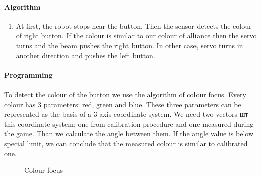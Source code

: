 	\paragraph{Algorithm}
	
	\begin{enumerate}	
		\item At first, the robot stops near the button. Then the sensor detects the colour of right button. If the colour is similar to our colour of alliance then the servo turns and the beam pushes the right button. In other case, servo turns in another direction and pushes the left button.  
	\end{enumerate}
	
	\paragraph{Programming}
 
	 To detect the colour of the button we use the algorithm of colour focus. Every colour has 3 parameters: red, green and blue. These three parameters can be represented as the basis of a 3-axis coordinate system. We need two vectors шт this coordinate system: one from calibration procedure and one measured during the game. Than we calculate the angle between them. If the angle value is below special limit, we can conclude that the measured colour is similar to calibrated one.
	 \begin{figure}[H]
	 	\begin{minipage}[h]{\linewidth}
	 		\caption{Colour focus}
	 	\end{minipage}
	\end{figure}

	\fillpage
